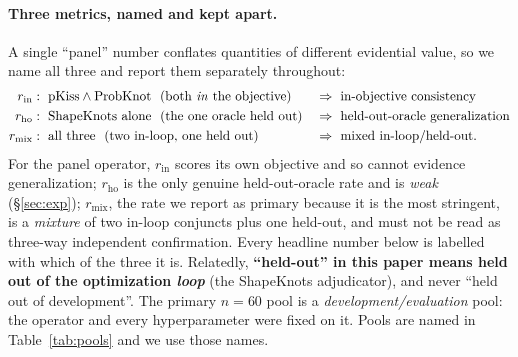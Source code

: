 \documentclass[11pt]{article}
\begin{document}
\paragraph{Three metrics, named and kept apart.} A single ``panel'' number conflates quantities of different
evidential value, so we name all three and report them separately throughout:
\begin{equation}\label{eq:metricnames}
\begin{aligned}
  r_{\mathrm{in}}  &:\ \text{pKiss}\wedge\text{ProbKnot \ (both \emph{in} the objective)}
                   &&\Rightarrow\ \text{in-objective consistency}\\
  r_{\mathrm{ho}}  &:\ \text{ShapeKnots alone \ (the one oracle held out)}
                   &&\Rightarrow\ \text{held-out-oracle generalization}\\
  r_{\mathrm{mix}} &:\ \text{all three \ (two in-loop, one held out)}
                   &&\Rightarrow\ \text{mixed in-loop/held-out}.
\end{aligned}
\end{equation}
For the panel operator, $r_{\mathrm{in}}$ scores its own objective and so cannot evidence generalization;
$r_{\mathrm{ho}}$ is the only genuine held-out-oracle rate and is \emph{weak} (\S\ref{sec:exp});
$r_{\mathrm{mix}}$, the rate we report as primary because it is the most stringent, is a
\emph{mixture} of two in-loop conjuncts plus one held-out, and must not be read as three-way independent
confirmation. Every headline number below is labelled with which of the three it is. Relatedly, \textbf{``held-out'' in this paper
means held out of the optimization \emph{loop}} (the ShapeKnots adjudicator), and never ``held out of
development''. The primary $n{=}60$ pool is a \emph{development/evaluation} pool: the operator and every
hyperparameter were fixed on it. Pools are named in Table~\ref{tab:pools} and we use those names.
\end{document}
